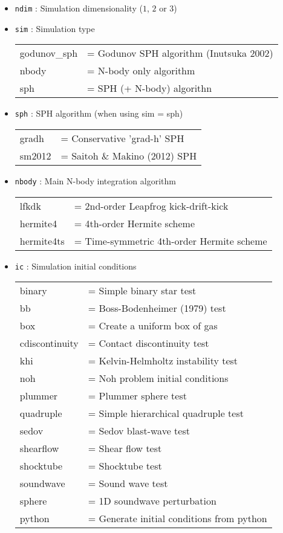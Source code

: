 \documentclass[a4paper]{article}
\newcommand{\var}[1]{\texttt{#1}}
\begin{document}
\begin{itemize}

\item \var{ndim} : Simulation dimensionality ($1$, $2$ or $3$)

\item \var{sim} : Simulation type \vspace{0.1cm} \\
\begin{tabular}{ll}
godunov\_sph      & = Godunov SPH algorithm (Inutsuka 2002) \\
nbody             & = N-body only algorithm \\
sph               & = SPH (+ N-body) algorithn 
\end{tabular}

\item \var{sph} : SPH algorithm (when using sim = sph) \\
\begin{tabular}{ll}
gradh    & = Conservative 'grad-h' SPH \\
sm2012   & = Saitoh \& Makino (2012) SPH
\end{tabular}

\item \var{nbody} : Main N-body integration algorithm \\
\begin{tabular}{ll}
lfkdk        & = 2nd-order Leapfrog kick-drift-kick \\
hermite4     & = 4th-order Hermite scheme \\
hermite4ts   & = Time-symmetric 4th-order Hermite scheme
\end{tabular}

\item \var{ic} : Simulation initial conditions \vspace{0.1cm} \\
\begin{tabular}{ll}
binary            & = Simple binary star test \\
bb                & = Boss-Bodenheimer (1979) test \\
box               & = Create a uniform box of gas \\
cdiscontinuity    & = Contact discontinuity test \\
khi               & = Kelvin-Helmholtz instability test \\
noh               & = Noh problem initial conditions \\
plummer           & = Plummer sphere test \\
quadruple         & = Simple hierarchical quadruple test \\
sedov             & = Sedov blast-wave test \\
shearflow         & = Shear flow test \\
shocktube         & = Shocktube test \\
soundwave         & = Sound wave test \\
sphere            & = 1D soundwave perturbation \\
python            & = Generate initial conditions from python
\end{tabular}


\end{itemize}
\end{document}
